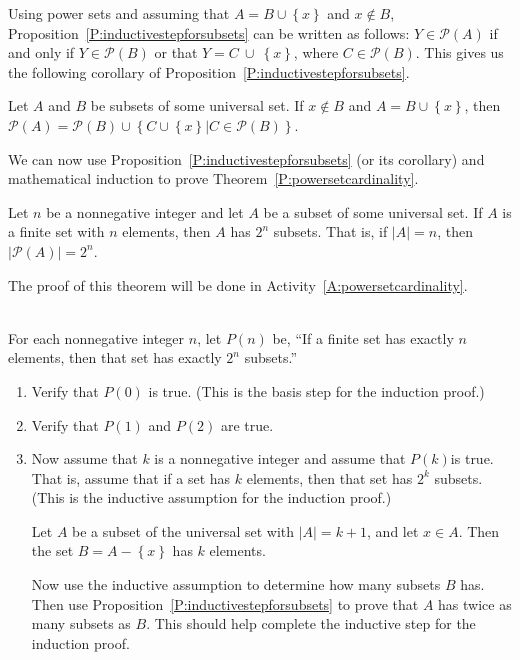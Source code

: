 Using power sets and assuming that $A = B \cup \left\{ x \right\}$ and  $x \notin B$, 
Proposition~\ref{P:inductivestepforsubsets} can be written as follows:  
$Y \in \mathcal{P}( A )$ if and only if  
$Y \in \mathcal{P}( B )$ or that   $Y = C \:\cup\: \left\{ x \right\}$, where  
$C \in \mathcal{P}( B )$.  This gives us the following corollary of 
Proposition~\ref{P:inductivestepforsubsets}.
%
\begin{corollary}\label{C:inductivestepforsubsets}
Let $A$ and $B$ be subsets of some universal set. If  $x \notin B$ and 
$A = B \cup \left\{ x \right\}$, then  $\mathcal{P}(A) = \mathcal{P}(B) \cup \left\{ {C \cup \left\{ x \right\} \left| {C \in \mathcal{P}(B)} \right.} \right\}$.
\end{corollary}
\hbreak

We can now use Proposition~\ref{P:inductivestepforsubsets} (or its corollary) and mathematical induction to prove Theorem~\ref{P:powersetcardinality}.

\begin{theorem}\label{P:powersetcardinality}
Let  $n$  be a nonnegative integer and let  $A$  be a subset of some universal set.  If  $A$  is a finite set with  $n$  elements, then  $A$  has  $2^n $ subsets.  That is,  if  $\left| A \right| = n$, then  $\left| {\mathcal{P}( A )} \right| = 2^n $.
\end{theorem}

\noindent
The proof of this theorem will be done in Activity~\ref{A:powersetcardinality}.


\begin{activity} \label{A:powersetcardinality}
%
%
 \hfill \\
For each nonnegative integer $n$, let $P ( n )$ be, ``If   a finite set has exactly  
$n$  elements, then  that set  has exactly  $2^n $ subsets.''
\begin{enumerate}
\item Verify that $P ( 0 )$ is true.  (This is the basis step for the induction proof.)

\item Verify that $P( 1 )$ and $P( 2 )$ are true.

\item Now assume that  $k$  is a nonnegative integer and assume that $P( k )$is true.  That is, assume that if a set has  $k$  elements, then that set has  $2^k $  subsets.  (This is the inductive assumption for the induction proof.)

Let  $A$  be a subset of the universal set with  $\left| A \right| = k + 1$, and let  
$x \in A$.  Then the set  $B = A - \left\{ x \right\}$ has  $k$  elements.

Now use the inductive assumption to determine how many subsets  $B$  has.  Then use  Proposition~\ref{P:inductivestepforsubsets} to prove that  $A$  has twice as many subsets as  $B$.  This should help complete the inductive step for the induction proof.
\end{enumerate}
\end{activity}
\hbreak

\endinput
